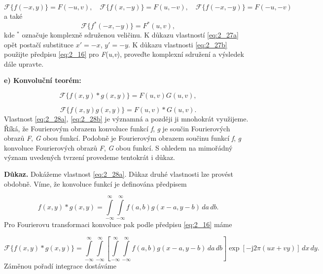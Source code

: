 \begin{equation} \label{eq:2_27a}
    \mathscr{F}\{f(-x, y)\} = F(-u, v), \quad \mathscr{F}\{f(x, -y)\} = F(u, - v), \quad \mathscr{F}\{f( -x, -y)\} = {F}( -u, -v)
\end{equation}
a také
\begin{equation} \label{eq:2_27b}
    \mathscr{F}\{f^*( -x, -y)\} = F^*(u, v),
\end{equation}
kde $^*$ označuje komplexně sdruženou veličinu. K důkazu vlastností \eqref{eq:2_27a} opět postačí substituce $x' = -x$, $y' = -y$. K důkazu vlastnosti \eqref{eq:2_27b} použijte předpisu \eqref{eq:2_16} pro \textit{F}(\textit{u},\textit{v}), proveďte komplexní sdružení a výsledek dále upravte.

\noindent \textbf{e) Konvoluční teorém:}

\begin{equation} \label{eq:2_28a}
    \mathscr{F}\{f(x, y) * g(x, y)\} = F(u, v) G(u, v),
\end{equation}

\begin{equation} \label{eq:2_28b}
    \mathscr{F}\{f(x, y) g(x, y)\} = F(u, v) * G(u, v).
\end{equation}
Vlastnost \eqref{eq:2_28a}, \eqref{eq:2_28b} je významná a později ji mnohokrát využijeme. Říká, že Fourierovým obrazem konvoluce funkcí \textit{f}, \textit{g} je součin Fourierových obrazů \textit{F}, \textit{G} obou funkcí. Podobně je Fourierovým obrazem součinu funkcí \textit{f}, \textit{g} konvoluce Fourierových obrazů \textit{F}, \textit{G} obou funkcí. S ohledem na mimořádný význam uvedených tvrzení provedeme tentokrát i důkaz.

\noindent \textbf{Důkaz.} Dokážeme vlastnost \eqref{eq:2_28a}. Důkaz druhé vlastnosti lze provést obdobně. Víme, že konvoluce funkcí je definována předpisem

\begin{equation}
    f(x, y) * g(x, y) = \int\limits_{-\infty}^{\infty} \int\limits_{-\infty}^{\infty} f(a, b) g( x - a, y - b)\,da\,db.\nonumber
\end{equation}
Pro Fourierovu transformaci konvoluce pak podle předpisu \eqref{eq:2_16} máme

\begin{equation}
    \mathscr{F}\{ f(x, y) * g(x, y) \} = \int\limits_{-\infty}^{\infty} \int\limits_{-\infty}^{\infty} \left[ \int\limits_{-\infty}^{\infty} \int\limits_{-\infty}^{\infty} f(a, b) g( x - a, y - b)\,da\,db \right] \exp \left[ - \mathrm{j} 2 \pi (ux + vy) \right]\,dx\,dy.\nonumber
\end{equation}
Záměnou pořadí integrace dostáváme

